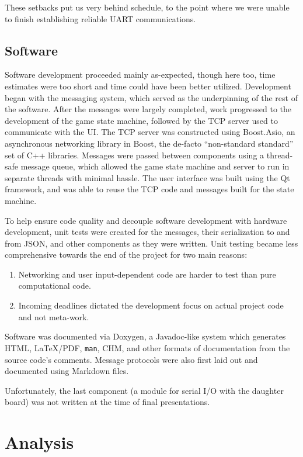 \documentclass[oneside]{book}
\begin{document}
These setbacks put us very behind schedule,
to the point where we were unable to finish establishing reliable UART communications.

\subsection{Software}

Software development proceeded mainly as-expected, though here too,
time estimates were too short and time could have been better utilized.
Development began with the messaging system,
which served as the underpinning of the rest of the software.
After the messages were largely completed,
work progressed to the development of the game state machine,
followed by the TCP server used to communicate with the UI.
The TCP server was constructed using Boost.Asio,
an asynchronous networking library in Boost,
the de-facto ``non-standard standard'' set of C++ libraries.
Messages were passed between components using a thread-safe message queue,
which allowed the game state machine and server to run in separate threads
with minimal hassle.
The user interface was built using the Qt framework,
and was able to reuse the TCP code and messages built for the state machine.

To help ensure code quality and decouple software development with hardware development,
unit tests were created for the messages, their serialization to and from JSON,
and other components as they were written.
Unit testing became less comprehensive towards the end of the project for two main reasons:
\begin{enumerate}
\item Networking and user input-dependent code are harder to test than pure computational code.
\item Incoming deadlines dictated the development focus on actual project code and not meta-work.
\end{enumerate}

Software was documented via Doxygen, a Javadoc-like system which generates
HTML, \LaTeX/PDF, \texttt{man}, CHM, and other formats of documentation from
the source code's comments.
Message protocols were also first laid out and documented using Markdown files.

Unfortunately, the last component (a module for serial I/O with the daughter board)
was not written at the time of final presentations.

\section{Analysis}
\end{document}
